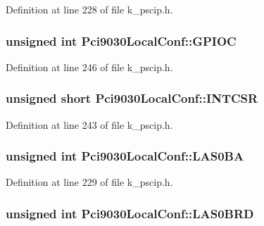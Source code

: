 Definition at line 228 of file k\_\-pscip.h.\hypertarget{struct_pci9030_local_conf_f75dbe512f25a1363528ff596e00bccb}{
\subsubsection[{GPIOC}]{\setlength{\rightskip}{0pt plus 5cm}unsigned int {\bf Pci9030LocalConf::GPIOC}}}
\label{struct_pci9030_local_conf_f75dbe512f25a1363528ff596e00bccb}




Definition at line 246 of file k\_\-pscip.h.\hypertarget{struct_pci9030_local_conf_bf5e1c5bcc3eca40ef7e17268538c16e}{
\subsubsection[{INTCSR}]{\setlength{\rightskip}{0pt plus 5cm}unsigned short {\bf Pci9030LocalConf::INTCSR}}}
\label{struct_pci9030_local_conf_bf5e1c5bcc3eca40ef7e17268538c16e}




Definition at line 243 of file k\_\-pscip.h.\hypertarget{struct_pci9030_local_conf_6232b249b11127b8a5bf42c615681175}{
\subsubsection[{LAS0BA}]{\setlength{\rightskip}{0pt plus 5cm}unsigned int {\bf Pci9030LocalConf::LAS0BA}}}
\label{struct_pci9030_local_conf_6232b249b11127b8a5bf42c615681175}




Definition at line 229 of file k\_\-pscip.h.\hypertarget{struct_pci9030_local_conf_9fcf5a5a65785075385ab27b763e4be3}{
\subsubsection[{LAS0BRD}]{\setlength{\rightskip}{0pt plus 5cm}unsigned int {\bf Pci9030LocalConf::LAS0BRD}}}
\label{struct_pci9030_local_conf_9fcf5a5a65785075385ab27b763e4be3}




